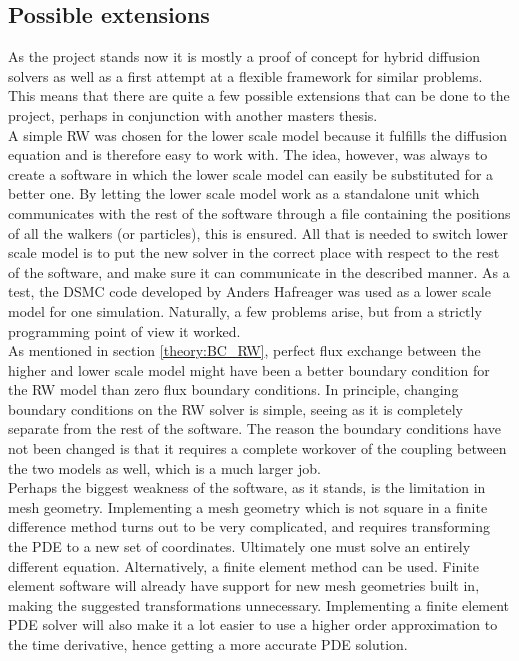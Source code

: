 \subsection{Possible extensions}
As the project stands now it is mostly a proof of concept for hybrid diffusion solvers as well as a first attempt at a flexible framework for similar problems. 
This means that there are quite a few possible extensions that can be done to the project, perhaps in conjunction with another masters thesis. \\

\noindent A simple RW was chosen for the lower scale model because it fulfills the diffusion equation and is therefore easy to work with. 
The idea, however, was always to create a software in which the lower scale model can easily be substituted for a better one. 
By letting the lower scale model work as a standalone unit which communicates with the rest of the software through a file containing the positions of all the walkers (or particles), this is ensured. 
All that is needed to switch lower scale model is to put the new solver in the correct place with respect to the rest of the software, and make sure it can communicate in the described manner. 
As a test, the DSMC code developed by Anders Hafreager was used as a lower scale model for one simulation. 
Naturally, a few problems arise, but from a strictly programming point of view it worked. \\

\noindent As mentioned in section \ref{theory:BC_RW}, perfect flux exchange between the higher and lower scale model might have been a better boundary condition for the RW model than zero flux boundary conditions. 
In principle, changing boundary conditions on the RW solver is simple, seeing as it is completely separate from the rest of the software. 
The reason the boundary conditions have not been changed is that it requires a complete workover of the coupling between the two models as well, which is a much larger job. \\

\noindent Perhaps the biggest weakness of the software, as it stands, is the limitation in mesh geometry. 
Implementing a mesh geometry which is not square in a finite difference method turns out to be very complicated, and requires transforming the PDE to a new set of coordinates. 
Ultimately one must solve an entirely different equation. 
Alternatively, a finite element method can be used. 
Finite element software will already have support for new mesh geometries built in, making the suggested transformations unnecessary. 
Implementing a finite element PDE solver will also make it a lot easier to use a higher order approximation to the time derivative, hence getting a more accurate PDE solution. 


